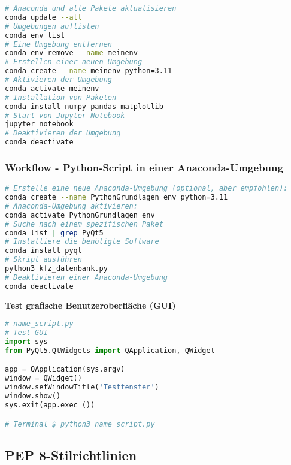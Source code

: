 \documentclass{vorlage-design-main}
\begin{document}
\begin{lstlisting}[language=bash]
# Anaconda und alle Pakete aktualisieren
conda update --all
# Umgebungen auflisten
conda env list
# Eine Umgebung entfernen
conda env remove --name meinenv
# Erstellen einer neuen Umgebung
conda create --name meinenv python=3.11
# Aktivieren der Umgebung
conda activate meinenv
# Installation von Paketen
conda install numpy pandas matplotlib
# Start von Jupyter Notebook
jupyter notebook
# Deaktivieren der Umgebung
conda deactivate
\end{lstlisting}

\hypertarget{workflow---python-script-in-einer-anaconda-umgebung}{%
\subsubsection{Workflow - Python-Script in einer
Anaconda-Umgebung}\label{workflow---python-script-in-einer-anaconda-umgebung}}

\begin{lstlisting}[language=bash]
# Erstelle eine neue Anaconda-Umgebung (optional, aber empfohlen):
conda create --name PythonGrundlagen_env python=3.11
# Anaconda-Umgebung aktivieren:
conda activate PythonGrundlagen_env
# Suche nach einem spezifischen Paket
conda list | grep PyQt5
# Installiere die benötigte Software
conda install pyqt
# Skript ausführen
python3 kfz_datenbank.py
# Deaktivieren einer Anaconda-Umgebung
conda deactivate
\end{lstlisting}

\textbf{Test grafische Benutzeroberfläche (GUI)}

\begin{lstlisting}[language=Python]
# name_script.py
# Test GUI
import sys
from PyQt5.QtWidgets import QApplication, QWidget

app = QApplication(sys.argv)
window = QWidget()
window.setWindowTitle('Testfenster')
window.show()
sys.exit(app.exec_())

# Terminal $ python3 name_script.py
\end{lstlisting}

\hypertarget{pep-8-stilrichtlinien}{%
\subsection{PEP 8-Stilrichtlinien}\label{pep-8-stilrichtlinien}}
\end{document}
